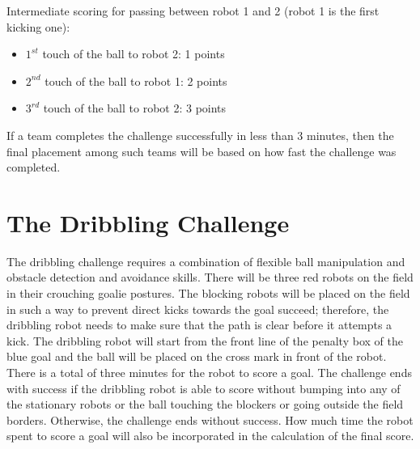 \documentclass{article}
\begin{document}
Intermediate scoring for passing between robot 1 and 2 (robot 1 is the first kicking one):
\begin{itemize}
 \item $1^{st}$ touch of the ball to robot 2: 1 points
 \item $2^{nd}$ touch of the ball to robot 1: 2 points
 \item $3^{rd}$ touch of the ball to robot 2: 3 points
\end{itemize}

If a team completes the challenge successfully in less than 3 minutes, then the final 
placement among such teams will be based on how fast the challenge was completed.

\section{The Dribbling Challenge}
\label{sec:dribbling}

The dribbling challenge requires a combination of flexible ball manipulation and obstacle 
detection and avoidance skills. There will be three red robots on the field in their 
crouching goalie postures. The blocking robots will be placed on the field in such a way 
to prevent direct kicks towards the goal succeed; therefore, the dribbling robot needs to 
make sure that the path is clear before it attempts a kick. The dribbling robot will start 
from the front line of the penalty box of the blue goal and the ball will be placed on the 
cross mark in front of the robot. There is a total of three minutes for the robot to score 
a goal. The challenge ends with success if the dribbling robot is able to score without 
bumping into any of the stationary robots or the ball touching the blockers or going outside 
the field borders. Otherwise, the challenge ends without success. How much time the robot 
spent to score a goal will also be incorporated in the calculation of the final score.
\end{document}
